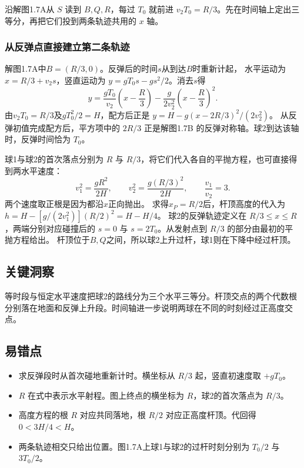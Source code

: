 \documentclass[UTF8,fontset=fandol,a4paper,11pt]{ctexart}
\begin{document}
沿解图1.7A从 $S$ 读到 $B,Q,R$，每过 $T_0$ 就前进 $v_2T_0=R/3$。先在时间轴上定出三等分，再把它们投到两条轨迹共用的 $x$ 轴。
\subsubsection*{从反弹点直接建立第二条轨迹}
解图1.7A中$B=(R/3,0)$。反弹后的时间$s$从到达$B$时重新计起，
水平运动为$x=R/3+v_2s$，竖直运动为
$y=gT_0s-gs^2/2$。消去$s$得
\[
y= \frac{gT_0}{v_2}\left(x-\frac R3\right)
-\frac{g}{2v_2^2}\left(x-\frac R3\right)^2.
\]
由$v_2T_0=R/3$及$gT_0^2/2=H$，配方后正是
$y=H-g(x-2R/3)^2/(2v_2^2)$。
从反弹初值完成配方后，平方项中的 $2R/3$ 正是解图1.7B 的反弹对称轴。球2到达该轴时，反弹时间恰为 $T_0$。

球1与球2的首次落点分别为 $R$ 与 $R/3$，将它们代入各自的平抛方程，也可直接得到两水平速度：
\[
v_1^2=\frac{gR^2}{2H},\qquad
v_2^2=\frac{g(R/3)^2}{2H},\qquad
\frac{v_1}{v_2}=3.
\]
两个速度取正根是因为都沿$x$正向抛出。
求得$x_P=R/2$后，杆顶高度的代入为
$h=H-[g/(2v_1^2)](R/2)^2=H-H/4$。
球2的反弹轨迹定义在 $R/3\leq x\leq R$，两端分别对应碰撞后的 $s=0$ 与 $s=2T_0$。从发射点到 $R/3$ 的部分由最初的平抛方程给出。
杆顶位于$B,Q$之间，所以球2上升过杆，球1则在下降中经过杆顶。




\subsection*{关键洞察}

等时段与恒定水平速度把球2的路线分为三个水平三等分。杆顶交点的两个代数根分别落在地面和反弹上升段。时间轴进一步说明两球在不同的时刻经过正高度交点。



\subsection*{易错点}

\begin{itemize}
\item 求反弹段时从首次碰地重新计时。横坐标从 $R/3$ 起，竖直初速度取 $+gT_0$。
\item $R$ 在式中表示水平射程。图上终点的横坐标为 $R$，球2的首次落点为 $R/3$。
\item 高度方程的根 $R$ 对应共同落地，根 $R/2$ 对应正高度杆顶。代回得 $0<3H/4<H$。
\item 两条轨迹相交只给出位置。图1.7A上球1与球2的过杆时刻分别为 $T_0/2$ 与 $3T_0/2$。
\end{itemize}
\end{document}
